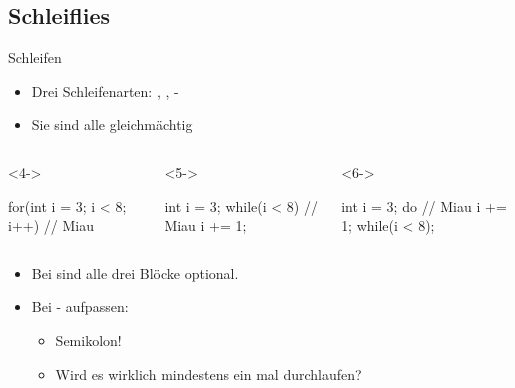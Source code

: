 {\subsection{Schleiflies}
\begin{frame}[fragile]{Schleifen}
   \vspace*{-.75\baselineskip}\begin{itemize}[<+(1)->]
      \itemsep5pt
      \item Drei Schleifenarten: , , -
      \item Sie sind alle gleichmächtig\vspace*{-7.125\baselineskip}
   \end{itemize}
\begin{layout-imageonly}
\begin{columns}[onlytextwidth,c]
\begin{uncoverenv}<4->
\begin{plainjava}
for(int i = 3; i < 8; i++) {
   // Miau
}
\end{plainjava}
\end{uncoverenv}
\begin{uncoverenv}<5->
\begin{plainjava}
int i = 3;
while(i < 8) {
   // Miau
   i += 1;
}
\end{plainjava}
\end{uncoverenv}
\begin{uncoverenv}<6->
\begin{plainjava}
int i = 3;
do {
   // Miau
   i += 1;
} while(i < 8);
\end{plainjava}
\end{uncoverenv}
\end{columns}\vspace*{-6.4\baselineskip}
\end{layout-imageonly}
\begin{itemize}
   \itemsep5pt
   \item<10-> Bei  sind alle drei Blöcke optional.
   \item<11-> Bei - aufpassen: \begin{itemize}
      \item<12-> Semikolon!
      \item<13-> Wird es wirklich mindestens ein mal durchlaufen?
   \end{itemize}
\end{itemize}
\end{frame}


}
